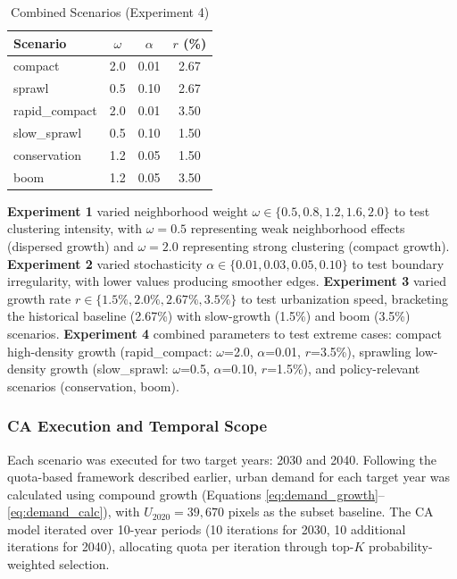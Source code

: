 \documentclass[12pt,a4paper]{article}
\begin{document}
\begin{table}[H]
\caption{Combined Scenarios (Experiment 4)}
\label{tab:combined}
\centering
\small
\renewcommand{\arraystretch}{1.2}
\begin{tabular}{lccc}
\toprule
\textbf{Scenario} & \textbf{$\omega$} & \textbf{$\alpha$} & \textbf{$r$ (\%)} \\
\midrule
compact & 2.0 & 0.01 & 2.67 \\
sprawl & 0.5 & 0.10 & 2.67 \\
rapid\_compact & 2.0 & 0.01 & 3.50 \\
slow\_sprawl & 0.5 & 0.10 & 1.50 \\
conservation & 1.2 & 0.05 & 1.50 \\
boom & 1.2 & 0.05 & 3.50 \\
\bottomrule
\end{tabular}
\end{table}

\textbf{Experiment 1} varied neighborhood weight $\omega \in \{0.5, 0.8, 1.2, 1.6, 2.0\}$ to test clustering intensity, with $\omega=0.5$ representing weak neighborhood effects (dispersed growth) and $\omega=2.0$ representing strong clustering (compact growth). \textbf{Experiment 2} varied stochasticity $\alpha \in \{0.01, 0.03, 0.05, 0.10\}$ to test boundary irregularity, with lower values producing smoother edges. \textbf{Experiment 3} varied growth rate $r \in \{1.5\%, 2.0\%, 2.67\%, 3.5\%\}$ to test urbanization speed, bracketing the historical baseline (2.67\%) with slow-growth (1.5\%) and boom (3.5\%) scenarios. \textbf{Experiment 4} combined parameters to test extreme cases: compact high-density growth (rapid\_compact: $\omega$=2.0, $\alpha$=0.01, $r$=3.5\%), sprawling low-density growth (slow\_sprawl: $\omega$=0.5, $\alpha$=0.10, $r$=1.5\%), and policy-relevant scenarios (conservation, boom).

\subsubsection{CA Execution and Temporal Scope}

Each scenario was executed for two target years: 2030 and 2040. Following the quota-based framework described earlier, urban demand for each target year was calculated using compound growth (Equations \ref{eq:demand_growth}--\ref{eq:demand_calc}), with $U_{2020} = 39{,}670$ pixels as the subset baseline. The CA model iterated over 10-year periods (10 iterations for 2030, 10 additional iterations for 2040), allocating quota per iteration through top-$K$ probability-weighted selection.
\end{document}
